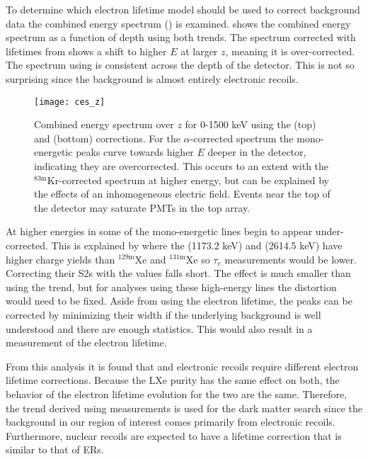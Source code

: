 To determine which electron lifetime model should be used to correct background data the combined energy spectrum
() is examined.   shows the combined energy spectrum as a function
of depth using both trends.  The spectrum corrected with lifetimes from \alphadecays shows a shift to higher $E$ at larger $z$, meaning
it is over-corrected.  The spectrum using \metakr is consistent across the depth of the detector.  This is not so surprising since the
background is almost entirely electronic recoils.

\begin{figure}
\centering
\texttt{[image: ces\_z]}
\caption{Combined energy spectrum over $z$ for 0-1500 keV using the \alphadecay (top) and \metakr (bottom) \stwob corrections.  For the
$\alpha$-corrected spectrum the mono-energetic peaks curve towards higher $E$ deeper in the detector, indicating they are
overcorrected.  This occurs to an extent with the $\mathrm{^{83m}Kr}$-corrected spectrum at higher energy, but can be explained by the
effects of an inhomogeneous electric field.  Events near the top of the detector may saturate PMTs in the top array.}
\label{fig:elifetime_fit_kr_z_dependence}
\end{figure}

At higher energies in  some of the mono-energetic lines begin to appear under-corrected.  This
is explained by  where the  (1173.2 keV) and  (2614.5 keV)
have higher charge yields than $\mathrm{^{129m}Xe}$ and $\mathrm{^{131m}Xe}$ so $\tau_e$ measurements would be lower.  Correcting their
S2s with the \metakr values falls short.  The effect is much smaller than using the \alphadecay trend, but for analyses using these
high-energy lines the distortion would need to be fixed.  Aside from using the electron lifetime, the peaks can be corrected by minimizing
their width if the underlying background is well understood and there are enough statistics.  This would also result in a measurement of
the electron lifetime.

From this analysis it is found that \alphadecays and electronic recoils require different electron lifetime corrections.  Because the LXe
purity has the same effect on both, the behavior of the electron lifetime evolution for the two are the same.  Therefore, the trend derived
using \metakr measurements is used for the dark matter search since the background in our region of interest comes primarily from electronic
recoils.  Furthermore, nuclear recoils are expected to have a lifetime correction that is similar to that of ERs.